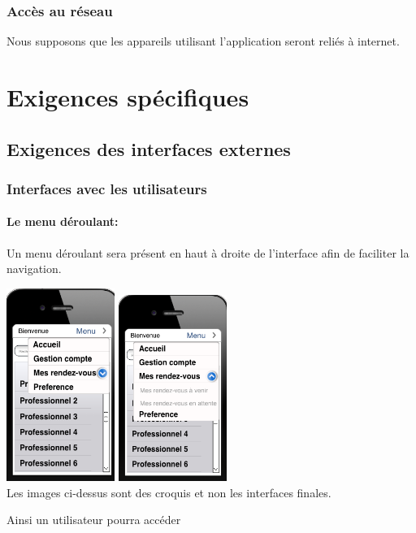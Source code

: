 \documentclass{article}
\begin{document}
\subsubsection{Accès au réseau}
Nous supposons que les appareils utilisant l'application seront reliés à internet.

\section{Exigences spécifiques}
\subsection{Exigences des interfaces externes}
\subsubsection{Interfaces avec les utilisateurs}
\paragraph{Le menu déroulant:}
Un menu déroulant sera présent en haut à droite de l'interface afin de faciliter la navigation.
\begin{center}
  \includegraphics[width=100pt]{user}
  \includegraphics[width=100pt]{deplie}
  \\Les images ci-dessus sont des croquis et non les interfaces finales.
\end{center}
Ainsi un utilisateur pourra accéder
\end{document}
